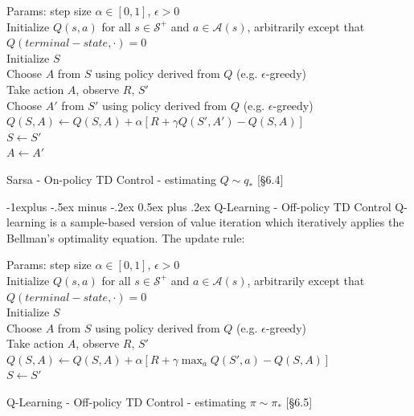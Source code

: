 \documentclass[10pt,landscape]{article}
\makeatletter
\renewcommand{\subsection}{\@startsection{subsection}{2}{0mm}%
                                {-1explus -.5ex minus -.2ex}%
                                {0.5ex plus .2ex}%
                                {\normalfont\normalsize\bfseries}}
\newcommand\numberthis{\addtocounter{equation}{1}\tag{\theequation}}
\makeatother
\begin{document}
\begin{multicols}{3}
\begin{algorithm}[H]
 Params: step size $\alpha \in [0,1]$, $\epsilon > 0$ \\
 Initialize $Q(s,a)$ for all $s \in \mathcal{S}^+$ and $a \in \mathcal{A}(s)$, arbitrarily except that $Q(terminal-state, \cdot) = 0$\\
{
    Initialize $S$\\
    Choose $A$ from $S$ using policy derived from $Q$ (e.g. $\epsilon$-greedy)\\
    {
      Take action $A$, observe $R$, $S'$\\
    	Choose $A'$ from $S'$ using policy derived from $Q$ (e.g. $\epsilon$-greedy)\\
      $Q(S, A) \leftarrow Q(S, A) + \alpha \left[R + \gamma Q(S', A') - Q(S, A)  \right]$\\
    	$S \leftarrow S'$\\
    	$A \leftarrow A'$ 
    }
 }
\caption{Sarsa - On-policy TD Control - estimating $Q \sim q_*$  [§6.4]}
\end{algorithm}

\subsection{Q-Learning - Off-policy TD Control}
Q-learning is a sample-based version of value iteration which iteratively applies the Bellman's optimality equation.
The update rule:


\begin{algorithm}[H]
 Params: step size $\alpha \in [0,1]$, $\epsilon > 0$\\
 Initialize $Q(s,a)$ for all $s \in \mathcal{S}^+$ and $a \in \mathcal{A}(s)$, arbitrarily except that $Q(terminal-state, \cdot) = 0$\\
{
    Initialize $S$\\
    {
      Choose $A$ from $S$ using policy derived from $Q$ (e.g. $\epsilon$-greedy)\\
      Take action $A$, observe $R$, $S'$\\
      $Q(S, A) \leftarrow Q(S, A) + \alpha \left[R + \gamma \max_a Q(S', a) - Q(S, A)  \right]$\\
    	$S \leftarrow S'$
    }
 }
\caption{Q-Learning - Off-policy TD Control - estimating $\pi \sim \pi_*$  [§6.5]}
\end{algorithm}


\end{multicols}
\end{document}

